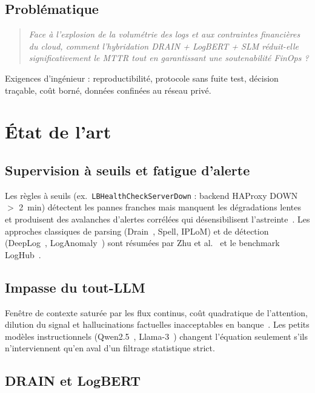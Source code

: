 \documentclass[12pt,a4paper]{report}
\begin{document}
\subsection{Problématique}

\begin{quote}
\emph{Face à l'explosion de la volumétrie des logs et aux contraintes financières du cloud, comment l'hybridation DRAIN + LogBERT + SLM réduit-elle significativement le MTTR tout en garantissant une soutenabilité FinOps ?}
\end{quote}

Exigences d'ingénieur : reproductibilité, protocole sans fuite test, décision traçable, coût borné, données confinées au réseau privé.

\section{État de l'art}

\subsection{Supervision à seuils et fatigue d'alerte}

Les règles à seuils (ex.\ \texttt{LBHealthCheckServerDown} : backend HAProxy DOWN $>$ 2~min) détectent les pannes franches mais manquent les dégradations lentes et produisent des avalanches d'alertes corrélées qui désensibilisent l'astreinte~\cite{ndichu2026}. Les approches classiques de parsing (Drain~\cite{he2017drain}, Spell, IPLoM) et de détection (DeepLog~\cite{du2017deeplog}, LogAnomaly~\cite{meng2019loganomaly}) sont résumées par Zhu et al.~\cite{zhu2019tools} et le benchmark LogHub~\cite{he2020loghub}.

\subsection{Impasse du tout-LLM}

Fenêtre de contexte saturée par les flux continus, coût quadratique de l'attention, dilution du signal et hallucinations factuelles inacceptables en banque~\cite{ji2023hallucination}. Les petits modèles instructionnels (Qwen2.5~\cite{qwen2025}, Llama-3~\cite{llama3}) changent l'équation seulement s'ils n'interviennent qu'en aval d'un filtrage statistique strict.

\subsection{DRAIN et LogBERT}
\end{document}
